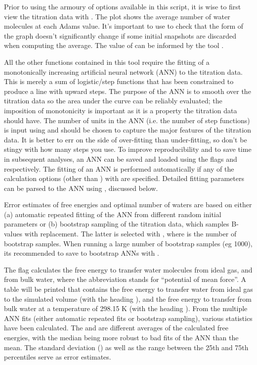 \documentclass[letterpaper,10pt,english]{sphinxmanual}
\begin{document}
Prior to using the armoury of options available in this script, it is wise to first view the titration data with . The plot shows the average number of water molecules at each Adams value. It's important to use  to check that the form of the graph doesn't significantly change if some initial snapshots are discarded when computing the average. The value of  can be informed by the tool .

All the other functions contained in this tool require the fitting of a monotonically increasing artificial neural network (ANN) to the titration data. This is merely a sum of logistic/step functions that has been constrained to produce a line with upward steps. The purpose of the ANN is to smooth over the titration data so the area under the curve can be reliably evaluated; the imposition of monotonicity is important as it is a property the titration data should have. The number of units in the ANN (i.e. the number of step functions) is input using  and should be chosen to capture the major features of the titration data. It is better to err on the side of over-fitting than under-fitting, so don't be stingy with how many steps you use. To improve reproducibility and to save time in subsequent analyses, an ANN can be saved and loaded using the flags  and  respectively. The fitting of an ANN is performed automatically if any of the calculation options (other than ) with  are specified. Detailed fitting parameters can be parsed to the ANN using , discussed below.

Error estimates of free energies and optimal number of waters are based on either (a) automatic repeated fitting of the ANN from different random initial parameters or (b) bootstrap sampling of the titration data, which samples B-values with replacement. The latter is selected with , where  is the number of bootstrap samples. When running a large number of bootstrap samples (eg 1000), its recommended to save to bootstrap ANNs with .

The flag  calculates the free energy to transfer water molecules from ideal gas, and from bulk water, where the abbreviation stands for “potential of mean force”. A table will be printed
that contains the free energy to transfer water from ideal gas to the simulated volume (with the heading ), and the free energy to transfer from bulk water at a temperature of 298.15 K (with the heading ). From the multiple ANN fits (either automatic repeated fits or bootstrap sampling), various statistics have been calculated. The  and  are different averages of the calculated free energies, with the median being more robust to bad fits of the ANN than the mean. The standard deviation () as well as the range between the 25th and 75th percentiles serve as error estimates.
\end{document}
